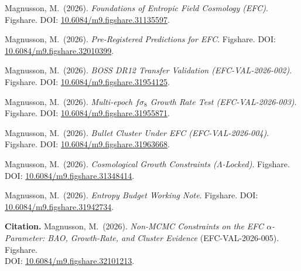 \documentclass[11pt,a4paper]{article}
\begin{document}
\begin{sloppypar}
\begin{enumerate}[leftmargin=22pt,itemsep=3pt,label={[\arabic*]}]
  \item Magnusson, M.\ (2026). \emph{Foundations of Entropic Field Cosmology (EFC)}. Figshare. DOI: \href{https://doi.org/10.6084/m9.figshare.31135597}{10.6084/m9.figshare.31135597}.
  \item Magnusson, M.\ (2026). \emph{Pre-Registered Predictions for EFC}. Figshare. DOI: \href{https://doi.org/10.6084/m9.figshare.32010399}{10.6084/m9.figshare.32010399}.
  \item Magnusson, M.\ (2026). \emph{BOSS DR12 Transfer Validation (EFC-VAL-2026-002)}. Figshare. DOI: \href{https://doi.org/10.6084/m9.figshare.31954125}{10.6084/m9.figshare.31954125}.
  \item Magnusson, M.\ (2026). \emph{Multi-epoch $f\sigma_8$ Growth Rate Test (EFC-VAL-2026-003)}. Figshare. DOI: \href{https://doi.org/10.6084/m9.figshare.31955871}{10.6084/m9.figshare.31955871}.
  \item Magnusson, M.\ (2026). \emph{Bullet Cluster Under EFC (EFC-VAL-2026-004)}. Figshare. DOI: \href{https://doi.org/10.6084/m9.figshare.31963668}{10.6084/m9.figshare.31963668}.
  \item Magnusson, M.\ (2026). \emph{Cosmological Growth Constraints ($\Lambda$-Locked)}. Figshare. DOI: \href{https://doi.org/10.6084/m9.figshare.31348414}{10.6084/m9.figshare.31348414}.
  \item Magnusson, M.\ (2026). \emph{Entropy Budget Working Note}. Figshare. DOI: \href{https://doi.org/10.6084/m9.figshare.31942734}{10.6084/m9.figshare.31942734}.
\end{enumerate}
\end{sloppypar}

\vspace{4pt}
\begin{notebox}
\begin{sloppypar}
\textbf{Citation.} Magnusson, M.\ (2026). \emph{Non-MCMC Constraints on the EFC $\alpha$-Parameter: BAO, Growth-Rate, and Cluster Evidence} (EFC-VAL-2026-005). Figshare. \\
DOI: \href{https://doi.org/10.6084/m9.figshare.32101213}{10.6084/m9.figshare.32101213}.
\end{sloppypar}
\end{notebox}
\end{document}

